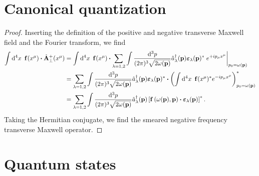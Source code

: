 \section{Canonical quantization}

\begin{proof}
	Inserting the definition of the positive and negative transverse Maxwell field and the Fourier transform, we find
	\begin{equation*}
		\begin{split}
			\int\dd[4]{x}\
			\vb{f}(x^\mu)
			\vdot
			\hat{\vb{A}}_\perp^+(x^\mu)
			&=
			\int\dd[4]{x}\
			\vb{f}(x^\mu)
			\vdot
			\sum_{\lambda=1,2}
			\int\frac{\dd[3]{p}}{(2\pi)^3\sqrt{2\omega(\vb{p})}}
			\hat{a}_\lambda^\dagger(\vb{p})
			\boldsymbol{\varepsilon}_\lambda(\vb{p})^*
			\eval{e^{+ip_\mu x^\mu}}_{p_0=\omega(\vb{p})}
			\\
			&=
			\sum_{\lambda=1,2}
			\int\frac{\dd[3]{p}}{(2\pi)^3\sqrt{2\omega(\vb{p})}}
			\hat{a}_\lambda^\dagger(\vb{p})
			\boldsymbol{\varepsilon}_\lambda(\vb{p})^*
			\vdot
			\left(
				\int\dd[4]{x}\
				\vb{f}(x^\mu)^*
				e^{-ip_\mu x^\mu}
			\right)_{p_0=\omega(\vb{p})}^*
			\\
			&=
			\sum_{\lambda=1,2}
			\int\frac{\dd[3]{p}}{(2\pi)^3\sqrt{2\omega(\vb{p})}}
			\hat{a}_\lambda^\dagger(\vb{p})
			\left[
				\vb{f}\left(\omega(\vb{p}),\vb{p}\right)
				\vdot
				\boldsymbol{\varepsilon}_\lambda(\vb{p})
			\right]^*
			.
		\end{split}
	\end{equation*}
	Taking the Hermitian conjugate, we find the smeared negative frequency transverse Maxwell operator.
\end{proof}

\section{Quantum states}

